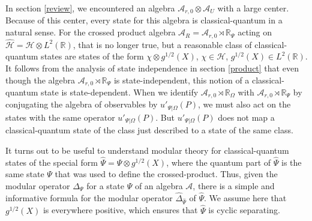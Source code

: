 \documentclass[11pt,a4paper]{article}
\def\h{\widehat}
\def\A{{\mathcal A}}
\def\R{{\mathbb R}}
\def\U{{ U}}
\def\h{\widehat}
\def\H{{\mathcal H}}
\begin{document}
In section \ref{review}, we encountered an algebra $\A_{r,0}\otimes \A_\U$ with a large center. Because of this center, every state for
this algebra is classical-quantum in a natural sense.  For  the crossed product algebra 
$\A_R=\A_{r,0}\rtimes \R_\Psi$ acting on $\h\H=\H\otimes L^2(\R)$, that is no longer true, but a reasonable class of classical-quantum states
are states of the form $\chi\otimes g^{1/2}(X)$, $\chi\in\H$, $g^{1/2}(X)\in L^2(\R)$.  
It follows from the analysis of state independence in section \ref{product} that even though the algebra $\A_{r,0}\rtimes \R_\Psi$ is state-independent,
this  notion of a classical-quantum state is state-dependent.   When we identify $\A_{r,0}\rtimes \R_\Omega$ with $\A_{r,0}\rtimes \R_\Psi$
by conjugating the algebra of observables by $u'_{\Psi|\Omega}(P)$, we must also act on the states with the same operator $u'_{\Psi|\Omega}(P)$.
But $u'_{\Psi|\Omega}(P)$ does not map a classical-quantum state of the class just described to a state of the same class.

It  turns out to be useful to understand modular theory for classical-quantum states of the special form $\h\Psi=\Psi\otimes g^{1/2}(X)$, where the quantum
part of $\h\Psi$ is the same state $\Psi$ that was used to define the crossed-product.   Thus, given the modular operator $\Delta_\Psi$
for a state $\Psi$ of an algebra $\A$, there is a simple and informative formula for the modular operator $\h \Delta_{\h \Psi}$ of 
$\h\Psi$.   We assume here that $g^{1/2}(X)$ is everywhere positive,
which ensures that $\h\Psi$ is  cyclic separating.   
\end{document}
